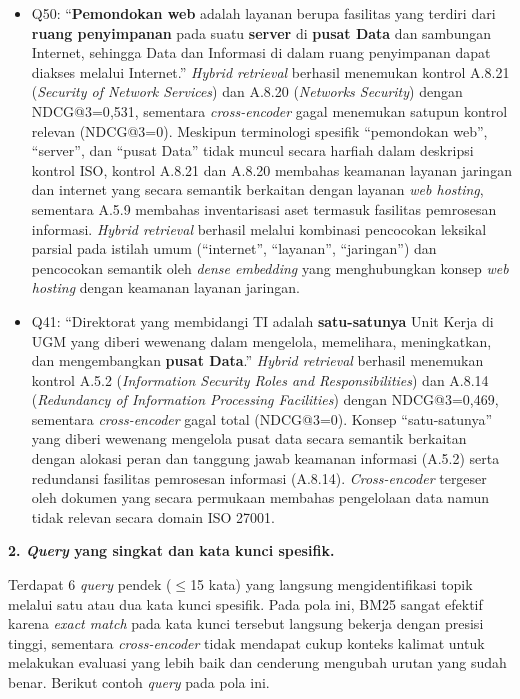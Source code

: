 \begin{itemize}
	\item Q50: ``\textbf{Pemondokan web} adalah layanan berupa fasilitas yang terdiri dari \textbf{ruang penyimpanan} pada suatu \textbf{server} di \textbf{pusat Data} dan sambungan Internet, sehingga Data dan Informasi di dalam ruang penyimpanan dapat diakses melalui Internet.'' \textit{Hybrid retrieval} berhasil menemukan kontrol A.8.21 (\textit{Security of Network Services}) dan A.8.20 (\textit{Networks Security}) dengan NDCG@3=0{,}531, sementara \textit{cross-encoder} gagal menemukan satupun kontrol relevan (NDCG@3=0). Meskipun terminologi spesifik ``pemondokan web'', ``server'', dan ``pusat Data'' tidak muncul secara harfiah dalam deskripsi kontrol ISO, kontrol A.8.21 dan A.8.20 membahas keamanan layanan jaringan dan internet yang secara semantik berkaitan dengan layanan \textit{web hosting}, sementara A.5.9 membahas inventarisasi aset termasuk fasilitas pemrosesan informasi. \textit{Hybrid retrieval} berhasil melalui kombinasi pencocokan leksikal parsial pada istilah umum (``internet'', ``layanan'', ``jaringan'') dan pencocokan semantik oleh \textit{dense embedding} yang menghubungkan konsep \textit{web hosting} dengan keamanan layanan jaringan.
	\item Q41: ``Direktorat yang membidangi TI adalah \textbf{satu-satunya} Unit Kerja di UGM yang diberi wewenang dalam mengelola, memelihara, meningkatkan, dan mengembangkan \textbf{pusat Data}.'' \textit{Hybrid retrieval} berhasil menemukan kontrol A.5.2 (\textit{Information Security Roles and Responsibilities}) dan A.8.14 (\textit{Redundancy of Information Processing Facilities}) dengan NDCG@3=0{,}469, sementara \textit{cross-encoder} gagal total (NDCG@3=0). Konsep ``satu-satunya'' yang diberi wewenang mengelola pusat data secara semantik berkaitan dengan alokasi peran dan tanggung jawab keamanan informasi (A.5.2) serta redundansi fasilitas pemrosesan informasi (A.8.14). \textit{Cross-encoder} tergeser oleh dokumen yang secara permukaan membahas pengelolaan data namun tidak relevan secara domain ISO 27001.
\end{itemize}

\textbf{2. \textit{Query} yang singkat dan kata kunci spesifik.}

Terdapat 6 \textit{query} pendek ($\leq$15 kata) yang langsung mengidentifikasi topik melalui satu atau dua kata kunci spesifik. Pada pola ini, BM25 sangat efektif karena \textit{exact match} pada kata kunci tersebut langsung bekerja dengan presisi tinggi, sementara \textit{cross-encoder} tidak mendapat cukup konteks kalimat untuk melakukan evaluasi yang lebih baik dan cenderung mengubah urutan yang sudah benar. Berikut contoh \textit{query} pada pola ini.

